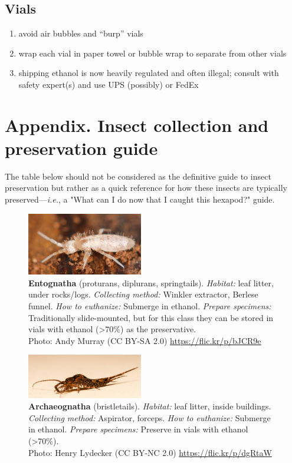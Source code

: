 \documentclass[letterpaper, 11pt]{article}
\begin{document}
\subsection*{Vials}
\begin{enumerate}
\item avoid air bubbles and “burp” vials
\item wrap each vial in paper towel or bubble wrap to separate from other vials
\item shipping ethanol is now heavily regulated and often illegal; consult with safety expert(s) and use UPS (possibly) or FedEx
\end{enumerate}

\clearpage
\section*{Appendix. Insect collection and preservation guide}
The table below should not be considered as the definitive guide to insect preservation but rather as a quick reference for how these insects are typically preserved---\textit{i.e.}, a "What can I do now that I caught this hexapod?" guide.

\begin{figure}
  \caption{\textbf{Entognatha} (proturans, diplurans, springtails). \textit{Habitat:} leaf litter, under rocks/logs. \textit{Collecting method:} Winkler extractor, Berlese funnel. \textit{How to euthanize:} Submerge in ethanol. \textit{Prepare specimens:} Traditionally slide-mounted, but for this class they can be stored in vials with ethanol (\textgreater70\%) as the preservative.\\ Photo: Andy Murray (CC BY-SA 2.0) \url{https://flic.kr/p/bJCR9e}}
  \includegraphics[width=0.45\textwidth]{Collembola}
\end{figure}

\begin{figure}
  \caption{\textbf{Archaeognatha} (bristletails). \textit{Habitat:} leaf litter, inside buildings. \textit{Collecting method:} Aspirator, forceps. \textit{How to euthanize:} Submerge in ethanol. \textit{Prepare specimens:} Preserve in vials with ethanol (\textgreater70\%).\\ Photo: Henry Lydecker (CC BY-NC 2.0) \url{https://flic.kr/p/dgRtaW}}
  \includegraphics[width=0.45\textwidth]{Archeognatha}
\end{figure}
\end{document}
